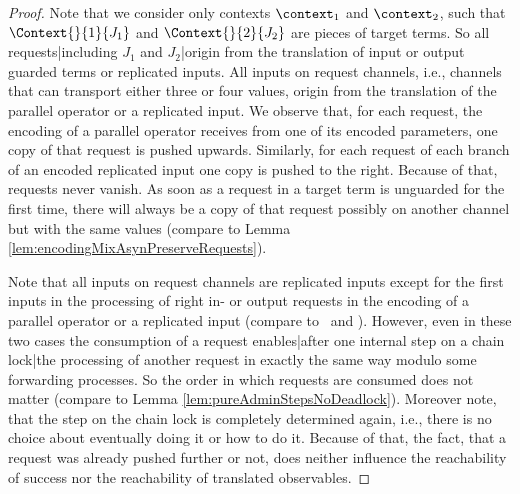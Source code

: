 \documentclass[]{llncs}
\begin{document}
\begin{proof}
	Note that we consider only contexts $ \context_1 $ and $ \context_2 $, such that $ \Context{}{1}{J_1} $ and $ \Context{}{2}{J_2} $ are pieces of target terms. So all requests|including $ J_1 $ and $ J_2 $|origin from the translation of input or output guarded terms or replicated inputs. All inputs on request channels, i.e., channels that can transport either three or four values, origin from the translation of the parallel operator or a replicated input. We observe that, for each request, the encoding of a parallel operator receives from one of its encoded parameters, one copy of that request is pushed upwards. Similarly, for each request of each branch of an encoded replicated input one copy is pushed to the right. Because of that, requests never vanish. As soon as a request in a target term is unguarded for the first time, there will always be a copy of that request possibly on another channel but with the same values (compare to Lemma \ref{lem:encodingMixAsynPreserveRequests}).
	
	Note that all inputs on request channels are replicated inputs except for the first inputs in the processing of right in- or output requests in the encoding of a parallel operator or a replicated input (compare to \processRightOutputRequests \ and \processRightInputRequests). However, even in these two cases the consumption of a request enables|after one internal step on a chain lock|the processing of another request in exactly the same way modulo some forwarding processes. So the order in which requests are consumed does not matter (compare to Lemma \ref{lem:pureAdminStepsNoDeadlock}). Moreover note, that the step on the chain lock is completely determined again, i.e., there is no choice about eventually doing it or how to do it. Because of that, the fact, that a request was already pushed further or not, does neither influence the reachability of success nor the reachability of translated observables.
	

\end{proof}
\end{document}
